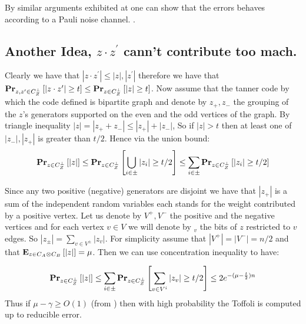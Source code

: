 \documentclass[manuscript,screen,review]{acmart}
\begin{document}
{By similar arguments exhibited at  one can show that the errors behaves according to a Pauli noise channel. .

\subsection{Another Idea, $z\cdot z^{\prime}$ cann't contribute too mach.}
Clearly we have that  $|z\cdot z^{\prime}| \le |z|,|z^{\prime}|$ therefore we have that $\prbm{ | z \cdot z^{\prime} | \ge t}{z,z^\prime \in \Czdu} \le \prbm{ | z | \ge t}{z\in \Czdu}$. Now assume that the tanner code by which the code defined is bipartite graph and denote by $z_{+},z_{-}$ the grouping of the $z$'s generators supported on the even and the odd vertices of the graph. By triangle inequality $|z| = |z_{+} + z_{-}| \le |z_{+}| + |z_{-}|$, So if $|z| > t$ then at least one of $|z_{-}|,|z_{+}|$ is greater than $t/2$. Hence via the union  bound: 
\begin{equation*}
  \begin{split}
    \prbm{ |z|  }{z\in \Czdu} \le \prbm{ \bigcup_{i \in \pm }{|z_{i}| \ge t/2}   }{z\in \Czdu} \le \sum_{i \in \pm }{\prbm{ |z_{i}| \ge t/2   }{z\in \Czdu}}
  \end{split}
\end{equation*}

Since any two positive (negative) generators are disjoint we have that  $|z_{+}|$ is a sum of the independent random variables each stands for the weight contributed by a positive vertex. Let us denote by $V^{+}, V^{-}$ the positive and the negative vertices and for each vertex $v \in V$ we will denote by $_{v}$ the bits of $z$ restricted to $v$ edges. So $|z_{\pm}| = \sum_{v \in V^{\pm}}{ |z_{v}| }$. For simplicity assume that $|V^{+}| = |V^{-}| = n/2$ and that $\exppm{|z|}{z \in C_{A}\otimes C_{B}} = \mu $. Then we can use concentration inequality to have: 

\begin{equation*}
  \begin{split}
    \prbm{ |z|  }{z\in \Czdu} \le \sum_{i \in \pm }{\prbm{ \sum_{v \in V^{i}}{ |z_{v}|} \ge t/2   }{z\in \Czdu}} \le 2e^{-(\mu - \frac{t}{2}) n }
  \end{split}
\end{equation*}
Thus if $\mu - \gamma  \ge O (1) $ (from  ) then with high probability the Toffoli is computed up to reducible error.    

}
\end{document}
